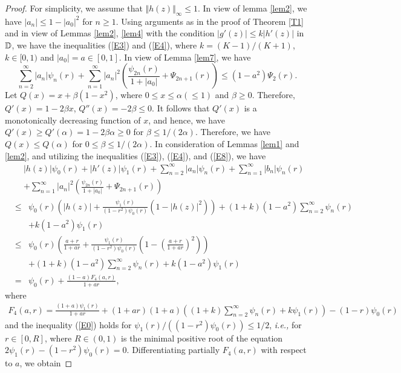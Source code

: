 \documentclass[11pt,reqno]{amsart}
\newtheorem{open problem}{Open problem}[section]
\newcommand{\D}{{\Bbb{D}}}
\newcommand{\be}{\begin{equation}}
\newcommand{\ee}{\end{equation}}
\newcommand{\beas}{\begin{eqnarray*}}
\newcommand{\eeas}{\end{eqnarray*}}
\newcommand{\bea}{\begin{eqnarray}}
\newcommand{\eea}{\end{eqnarray}}
\numberwithin{equation}{section}
\begin{document}
\begin{proof}
For simplicity, we assume that $\Vert h(z)\Vert_\infty\leq 1$. In view of \textrm{lemma \ref{lem2}}, we have $|a_n|\leq 1-|a_0|^2$ 
for $n\geq 1$. 
Using arguments as in the proof of \textrm{Theorem \ref{T1}} and in view of \textrm{Lemmas \ref{lem2}}, \ref{lem4} with the condition $|g'(z)|\leq k|h'(z)|$ in $\D$, we have the inequalities (\ref{E3}) and (\ref{E4}),
where $k= (K-1)/(K+1)$, $k\in[0,1)$ and $|a_0|=a\in[0,1]$. In view of \textrm{Lemma \ref{lem7}}, we have 
\be\label{E8} \sum_{n=2}^\infty |a_n|\psi_n(r)+\sum_{n=1}^\infty |a_n|^2\left(\frac{\psi_{2n}(r)}{1+|a_0|}+\Psi_{2n+1}(r)\right)\leq \left(1-a^2\right)\Psi_2(r).\ee
Let $Q(x)=x+\beta(1-x^2)$, where $0\leq x\leq \alpha(\leq1)$ and $\beta\geq 0$. Therefore, $Q'(x)=1-2\beta x$, 
$Q''(x)=-2\beta\leq 0$. It follows that $Q'(x)$ is a monotonically decreasing function of $x$, and hence, we have $Q'(x)\geq Q'(\alpha)=1-2\beta\alpha\geq 0$ for $\beta\leq 1/(2\alpha)$. 
Therefore, we have $Q(x)\leq Q(\alpha)$ for $0\leq \beta\leq 1/(2\alpha)$. 
In consideration of \textrm{Lemmas \ref{lem1}} and \ref{lem2}, and utilizing the inequalities (\ref{E3}), (\ref{E4}), and (\ref{E8}), we have 
\beas &&|h(z)|\psi_0(r)+|h'(z)|\psi_1(r)+\sum_{n=2}^\infty |a_n| \psi_n(r)+\sum_{n=1}^\infty |b_n| \psi_n(r)\nonumber\\[2mm]
&&+\sum_{n=1}^\infty |a_n|^2\left(\frac{\psi_{2n}(r)}{1+|a_0|}+\Psi_{2n+1}(r)\right)\eeas
\bea&\leq&\psi_0(r)\left(|h(z)|+\frac{\psi_1(r)}{\left(1-r^2\right)\psi_0(r)}\left(1-|h(z)|^2\right)\right)+(1+k)\left(1-a^2\right)\sum_{n=2}^\infty \psi_n(r)\nonumber\\[2mm]
&&+k\left(1-a^2\right)\psi_1(r)\nonumber\\[2mm]
\label{E0}&\leq&\psi_0(r)\left(\frac{a+r}{1+ar}+\frac{\psi_1(r)}{\left(1-r^2\right)\psi_0(r)}\left(1-\left(\frac{a+r}{1+ar}\right)^2\right)\right)\\[2mm]
&&+(1+k)\left(1-a^2\right)\sum_{n=2}^\infty \psi_n(r)+k\left(1-a^2\right)\psi_1(r)\nonumber\\[2mm]
&=&\psi_0(r)+\frac{(1-a)F_4(a,r)}{1+ar},\nonumber\eea
where 
\beas F_4(a,r)=\frac{(1+a)\psi_1(r)}{1+ar}+(1+ar)\left(1+a\right)\left((1+k)\sum_{n=2}^\infty \psi_n(r)+k\psi_1(r)\right)-(1-r)\psi_0(r)\eeas
and the inequality (\ref{E0}) holds for $\psi_1(r)/\left(\left(1-r^2\right)\psi_0(r)\right)\leq 1/2$, {\it i.e.,} for $r\in[0,R]$, where $R\in(0,1)$ is the minimal positive root of the equation $2\psi_1(r)-\left(1-r^2\right)\psi_0(r)=0$.
Differentiating partially $F_4(a,r)$ with respect to $a$, we obtain 

\end{proof}
\end{document}
